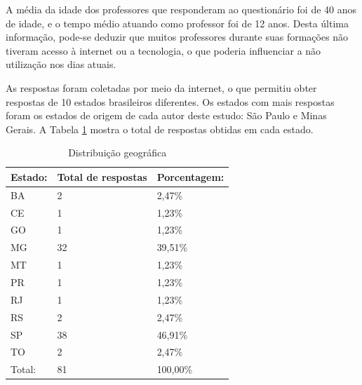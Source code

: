 A média da idade dos professores que responderam ao questionário foi de 40 anos de idade, e o tempo médio atuando como professor foi de 12 anos. Desta última informação, pode-se deduzir que muitos professores durante suas formações não tiveram acesso à internet ou a tecnologia, o que poderia influenciar a não utilização nos dias atuais.

As respostas foram coletadas por meio da internet, o que permitiu obter respostas de 10 estados brasileiros diferentes. Os estados com mais respostas foram os estados de origem de cada autor deste estudo: São Paulo e Minas Gerais.
A Tabela \ref{tab:distribuicao_geografica} mostra o total de respostas obtidas em cada estado.

\bgroup
\def\arraystretch{1.5} %
\begin{table}[h]{} %
\centering
\begin{tabular}{ | p{3cm} | p{5cm}| p{5cm}| } \hline
\textbf{Estado:} & \textbf{Total de respostas} & \textbf{Porcentagem: } \\ \hline
BA & 2 & 2,47\% \\ \hline
CE & 1 & 1,23\% \\ \hline
GO & 1 & 1,23\% \\ \hline
MG & 32 & 39,51\% \\ \hline
MT & 1 & 1,23\% \\ \hline
PR & 1 & 1,23\% \\ \hline
RJ & 1 & 1,23\% \\ \hline
RS & 2 & 2,47\% \\ \hline
SP & 38 & 46,91\% \\ \hline
TO & 2 & 2,47\% \\ \hline
Total: & 81 & 100,00\% \\ \hline
\end{tabular}
\caption{Distribuição geográfica}
\label{tab:distribuicao_geografica}
\end{table}
\egroup


